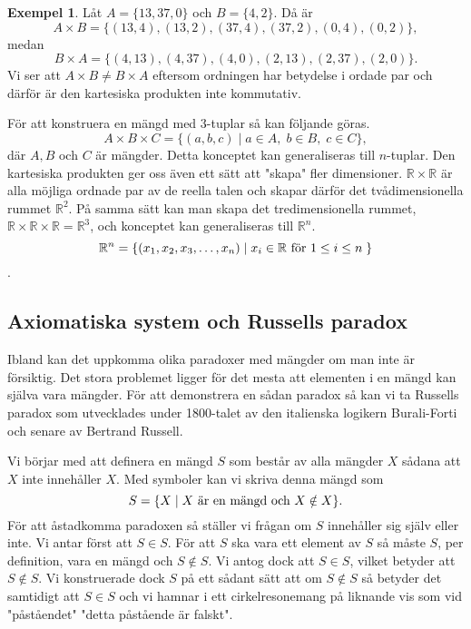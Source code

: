 \documentclass{article}
\theoremstyle{definition}
\newtheorem{exmp}[thm]{Exempel}
\begin{document}
\begin{exmp}
  Låt $A = \{13, 37, 0\}$ och $B = \{4, 2\}$. Då är
\[A \times B = \{ (13, 4), (13, 2), (37, 4), (37, 2), (0, 4), (0, 2) \},\]
medan 
\[B \times A = \{ (4, 13), (4, 37), (4, 0), (2, 13), (2, 37), (2, 0) \}.\]
Vi ser att $A \times B \neq B \times A$ eftersom ordningen
har betydelse i ordade par och därför är den kartesiska produkten inte kommutativ. 
\end{exmp}
För att konstruera en mängd med $3$-tuplar så kan följande göras.
\[A \times B \times C = \{ (a, b, c) \; | \; a \in A, \; b \in B, \; c \in C \},\]
där $A, B$ och $C$ är mängder. Detta konceptet kan generaliseras till $n$-tuplar. 
Den kartesiska produkten ger oss även ett sätt att "skapa" fler dimensioner.
$\mathbb{R} \times \mathbb{R}$ är alla möjliga ordnade par av de reella talen och skapar därför det 
tvådimensionella rummet $\mathbb{R}^2$. På samma sätt kan man skapa det tredimensionella rummet,
$\mathbb{R} \times \mathbb{R} \times \mathbb{R} = \mathbb{R}^3$, och konceptet kan generaliseras till 
$\mathbb{R}^n$. 
\[\mathbb{R}^n = \{(x_1, x_2, x_3, \ldots, x_n) \; | \; x_i \in \mathbb{R} \textnormal{ för } 1 
\leq i \leq n\; \} \].


\subsection{Axiomatiska system och Russells paradox}
Ibland kan det uppkomma olika paradoxer med mängder om man inte är försiktig. Det stora problemet 
ligger för det mesta att elementen i en mängd kan själva vara mängder. För att demonstrera en sådan 
paradox så kan vi ta Russells paradox som utvecklades under 1800-talet av den italienska logikern Burali-Forti
och senare av Bertrand Russell. 

Vi börjar med att definera en mängd $S$ som består av alla mängder $X$ sådana att $X$ inte innehåller 
$X$. Med symboler kan vi skriva denna mängd som
\[S = \{X \; | \; X \textnormal{ är en mängd och } X \notin X  \}. \]
För att åstadkomma paradoxen så ställer vi frågan om $S$ innehåller sig själv eller inte. 
Vi antar först att $S \in S$.
För att $S$ ska vara ett element av $S$ så 
måste $S$, per definition, vara en mängd och $S \notin S$.
Vi antog dock att $S \in S$, vilket betyder att $S \notin S$. Vi konstruerade dock $S$ på ett sådant sätt att om $S \notin S$ så betyder det samtidigt att $S \in S$ och vi hamnar i ett
cirkelresonemang på liknande vis som vid "påståendet" "detta påstående är falskt".
\end{document}
